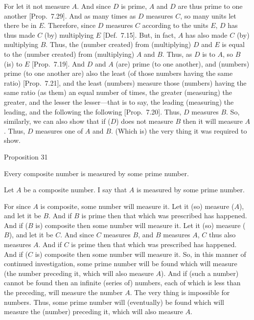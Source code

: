 For let it not measure $A$. And since $D$ is prime, $A$ and $D$ are thus prime to
one another [Prop.~7.29]. 
And as many times as $D$ measures $C$, so many units let there be in $E$.
Therefore, since $D$ measures $C$ according to the units $E$, $D$ has thus
made $C$ (by) multiplying $E$ [Def.~7.15].
But, in fact, $A$ has also made $C$ (by) multiplying $B$. Thus, the
(number created) from (multiplying) $D$ and $E$ is equal to
the (number created) from (multiplying) $A$ and $B$. Thus, as $D$ is to $A$,
so $B$ (is) to $E$ [Prop.~7.19]. And
$D$ and $A$ (are) prime (to one another), and (numbers) prime (to one another
are) also the least (of those numbers having the same ratio) [Prop.~7.21], and the least (numbers) measure
those (numbers) having the same ratio (as them) an equal number of times, the
greater (measuring) the greater, and the lesser the lesser---that is to
say, the leading (measuring) the leading, and the following the following
[Prop.~7.20]. Thus, $D$ measures $B$. So,
 similarly, we can also show that if ($D$) does not measure $B$ then it will measure
 $A$. Thus, $D$ measures one of $A$ and $B$. (Which is) the very thing it was required to show.


\begin{center}
{\large Proposition 31}
\end{center}

Every composite number is measured by some
prime number.

Let $A$ be a composite number. I say that $A$ is measured by some prime
number.

For since $A$ is composite, some number will measure it. Let it (so)
measure ($A$), and let it be $B$. And if $B$ is prime then that which was
prescribed has happened. And if ($B$ is) composite then some number
will measure it. Let it (so) measure ($B$), and let it be $C$. And since
$C$ measures $B$, and $B$ measures $A$, $C$ thus also measures $A$. And
if $C$ is prime then that which was prescribed has happened. 
And if ($C$ is) composite then some number will measure it. So, in this
manner of continued investigation, some prime number will be found
which will measure (the number preceding it, which will also
measure $A$). And if (such a number) cannot be found then
 an infinite (series of) numbers, each of which is less than the
preceding, will measure the number $A$. The very thing is impossible for numbers. Thus, some prime
number will (eventually) be found which will measure the (number) preceding it, 
which will also measure $A$.

